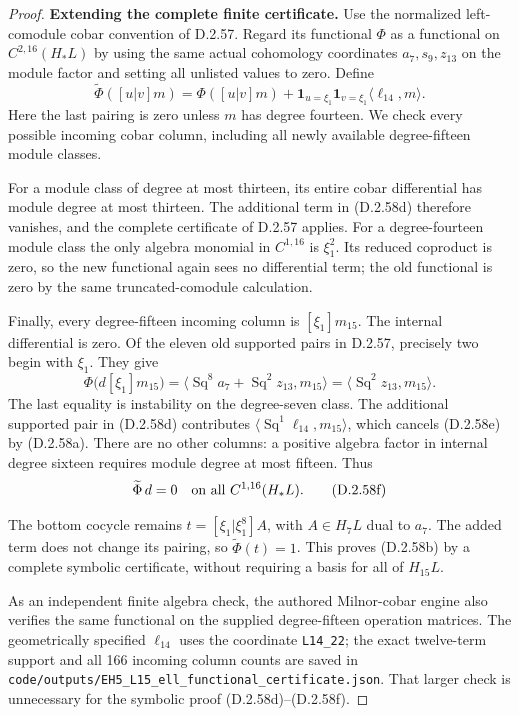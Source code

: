 \begin{proof}


\medskip\noindent
\textbf{Extending the complete finite certificate.}
Use the normalized left-comodule cobar convention of D.2.57.
Regard its functional $\Phi$ as a functional on
$C^{2,16}(H_*L)$ by using the same actual cohomology
coordinates $a_7,s_9,z_{13}$ on the module factor and
setting all unlisted values to zero.  Define
\[
 \widetilde\Phi([u|v]m)=\Phi([u|v]m)
   +\mathbf1_{u=\xi_1}\mathbf1_{v=\xi_1}
                   \langle\ell_{14},m\rangle.
 \tag{D.2.58d}
\]
Here the last pairing is zero unless $m$ has degree
fourteen.  We check every possible incoming cobar column,
including all newly available degree-fifteen module classes.

For a module class of degree at most thirteen, its entire
cobar differential has module degree at most thirteen.
The additional term in \textup{(D.2.58d)} therefore vanishes,
and the complete certificate of D.2.57 applies.  For a
degree-fourteen module class the only algebra monomial in
$C^{1,16}$ is $\xi_1^2$.  Its reduced coproduct is zero,
so the new functional again sees no differential term;
the old functional is zero by the same truncated-comodule
calculation.

Finally, every degree-fifteen incoming column is
$[\xi_1]m_{15}$.  The internal differential is zero.
Of the eleven old supported pairs in D.2.57, precisely two
begin with $\xi_1$.  They give
\[
 \Phi\bigl(d[\xi_1]m_{15}\bigr)
   =\langle\operatorname{Sq}^8a_7+
                \operatorname{Sq}^2z_{13},m_{15}\rangle
   =\langle\operatorname{Sq}^2z_{13},m_{15}\rangle.
 \tag{D.2.58e}
\]
The last equality is instability on the degree-seven
class.  The additional supported pair in
\textup{(D.2.58d)} contributes
$\langle\operatorname{Sq}^1\ell_{14},m_{15}\rangle$,
which cancels \textup{(D.2.58e)} by
\textup{(D.2.58a)}.  There are no other columns:
a positive algebra factor in internal degree sixteen
requires module degree at most fifteen.  Thus
\[
             \widetilde\Phi\,d=0
                       \quad\hbox{on all }C^{1,16}(H_*L).
             \tag{D.2.58f}
\]

The bottom cocycle remains
$t=[\xi_1|\xi_1^8]A$, with $A\in H_7L$ dual to $a_7$.
The added term does not change its pairing, so
$\widetilde\Phi(t)=1$.  This proves
\textup{(D.2.58b)} by a complete symbolic certificate,
without requiring a basis for all of $H_{15}L$.

As an independent finite algebra check, the authored
Milnor-cobar engine also verifies the same functional on
the supplied degree-fifteen operation matrices.  The
geometrically specified $\ell_{14}$ uses the coordinate
\texttt{L14\_22}; the exact twelve-term support and all
166 incoming column counts are saved in
\texttt{code/outputs/EH5\_L15\_ell\_functional\_certificate.json}.
That larger check is unnecessary for the symbolic proof
\textup{(D.2.58d)--(D.2.58f)}.


\end{proof}
